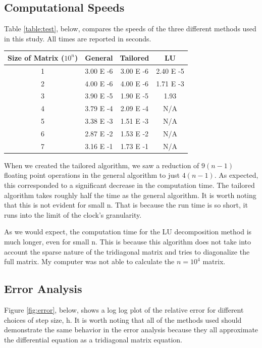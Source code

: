 \documentclass[%
oneside,                 %
final,                   %
10pt]{article}
\begin{document}
\subsection{Computational Speeds}

Table \ref{table:test}, below, compares the speeds of the three different methods used in this study.  All times are reported in seconds. 

\begin{center} 
\begin{tabular}{ |c|c|c|c| }
\hline
Size of Matrix ($10^n$) & General & Tailored & LU \\
\hline
1& 3.00 E -6 & 3.00 E -6 & 2.40 E -5\\ 
2 & 4.00 E -6 & 4.00 E -6 & 1.71 E -3 \\ 
3 & 3.90 E -5 & 1.90 E -5 & 1.93\\ 
4 & 3.79 E -4 & 2.09 E -4 & N/A\\ 
5 & 3.38 E -3 & 1.51 E -3  & N/A\\ 
6 & 2.87 E -2 & 1.53 E -2 & N/A\\ 
7 & 3.16 E -1 & 1.73 E -1& N/A\\ 
\hline
\end{tabular}
\label{table:test}
\end{center}

When we created the tailored algorithm, we saw a reduction of $9(n-1)$ floating point operations in the general algorithm to just $4(n-1)$.  As expected, this corresponded to a significant decrease in the computation time.  The tailored algorithm takes roughly half the time as the general algorithm.  It is worth noting that this is not evident for small n.  That is because the run time is so short, it runs into the limit of the clock's granularity.

As we would expect, the computation time for the LU decomposition method is much longer, even for small n.  This is because this algorithm does not take into account the sparse nature of the tridiagonal matrix and tries to diagonalize the full matrix.  My computer was not able to calculate the $n=10^4$ matrix.

\subsection{Error Analysis}

Figure \ref{fig:error}, below, shows a log log plot of the relative error for different choices of step size, h.  It is worth noting that all of the methods used should demonstrate the same behavior in the error analysis because they all approximate the differential equation as a tridiagonal matrix equation.
\end{document}
